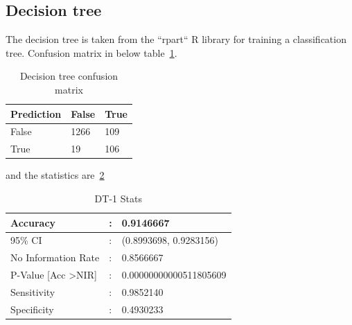 \subsection{Decision tree}
The decision tree is taken from the ``rpart`` R library for training a classification tree. 
Confusion matrix in below table~\ref{dt-cm}.
	\begin{table}[H]
		\centering
		\caption{Decision tree confusion matrix}
		\label{dt-cm}
		\begin{tabular}{lll}
			\hline
			Prediction & False & True \\
			\hline
			False & 1266 & 109 \\
			\hline
			True & 19 & 106 \\
			\hline
		\end{tabular}
	\end{table}
and the statistics are~\ref{dt-1-stats}
	\begin{table}[H]
		\centering
		\caption{DT-1 Stats}
		\label{dt-1-stats}
		\begin{tabular}{p{5cm}p{1cm}p{5cm}}
			Accuracy  & : & 0.9146667 \\
			\hline
			95\% CI   & : & (0.8993698, 0.9283156) \\ \hline
			No Information Rate  & : & 0.8566667 \\ \hline
			P-Value {[}Acc \textgreater NIR{]}  & : & 0.00000000000511805609 \\ \hline
			Sensitivity  & : & 0.9852140 \\ \hline
			Specificity  & : & 0.4930233 \\ \hline
			
		\end{tabular}
	\end{table}
	
